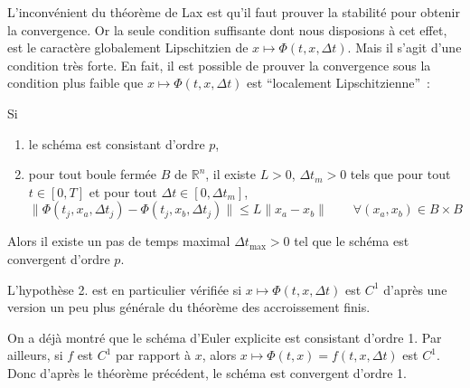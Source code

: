 \hypertarget{ed2-theo_CS_conv}{}
\begin{theoreme}\label{ed2-theo_CS_conv}
L'inconvénient du théorème de Lax est qu'il faut prouver la stabilité
pour obtenir la convergence. Or la seule condition suffisante dont nous
disposions à cet effet, est le caractère globalement Lipschitzien de
\(x\mapsto \Phi(t,x,{\Delta t})\). Mais il s'agit d'une condition très
forte. En fait, il est possible de prouver la convergence sous la
condition plus faible que \(x\mapsto \Phi(t,x,{\Delta t})\) est
``localement Lipschitzienne''~:

Si

\begin{enumerate}
\def\labelenumi{\arabic{enumi}.}
\item
  le schéma est consistant d'ordre \(p\),
\item
  pour tout boule fermée \(B\) de \(\mathbb{R}^n\), il existe \(L>0\),
  \({\Delta t}_m>0\) tels que pour tout \(t\in \left[ 0,T \right]\) et
  pour tout \({\Delta t}\in \left[ 0, {\Delta t}_m \right]\), \[
  \|\Phi(t_j,x_a,{\Delta t}_j)-\Phi(t_j,x_b,{\Delta t}_j)\|\leq L \|x_a-x_b\| \qquad \forall (x_a,x_b)\in B\times B 
  \]
\end{enumerate}

Alors il existe un pas de temps maximal \({\Delta t}_{\max}>0\) tel que
le schéma est convergent d'ordre \(p\).

L'hypothèse 2. est en particulier vérifiée si
\(x\mapsto \Phi(t,x,{\Delta t})\) est \(C^1\) d'après une version un peu
plus générale du théorème des accroissement finis.
\end{theoreme}

\hypertarget{ed2-ex_conv_Euler}{}
\begin{exemple}\label{ed2-ex_conv_Euler}
On a déjà montré que le schéma d'Euler explicite est consistant d'ordre
1. Par ailleurs, si \(f\) est \(C^1\) par rapport à \(x\), alors
\(x\mapsto \Phi(t,x) = f(t,x,{\Delta t})\) est \(C^1\). Donc d'après le
théorème précédent, le schéma est convergent d'ordre 1.
\end{exemple}

